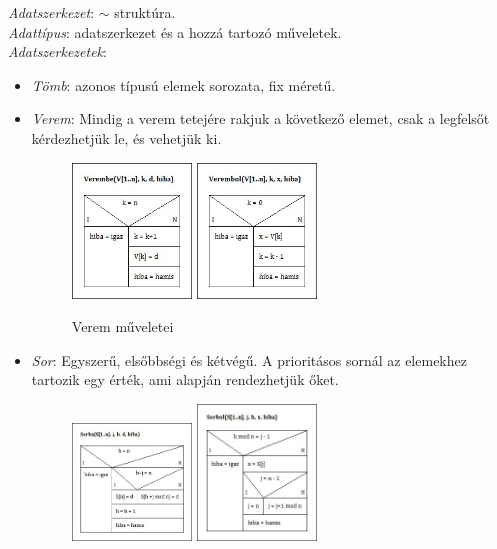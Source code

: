 \documentclass[margin=0px]{article}
\begin{document}
	\textit{Adatszerkezet}: $\sim$ struktúra. \\
	\textit{Adattípus}: adatszerkezet és a hozzá tartozó műveletek. \\
	\textit{Adatszerkezetek}:
	\begin{itemize}
		\item \textit{Tömb}: azonos típusú elemek sorozata, fix méretű.
		\item \textit{Verem}: Mindig a verem tetejére rakjuk a következő elemet, csak a legfelsőt kérdezhetjük le, és vehetjük ki.
		\begin{figure}[H]
			\centering
			\includegraphics[width=0.3\textwidth]{img/Verembe.jpg}
			\includegraphics[width=0.3\textwidth]{img/Verembol.jpg}
			\caption{Verem műveletei}
		\end{figure}
		\item \textit{Sor}: Egyszerű, elsőbbségi és kétvégű. A prioritásos sornál az elemekhez tartozik egy érték, ami alapján rendezhetjük  őket.
		\begin{figure}[H]
			\centering
			\includegraphics[width=0.3\textwidth]{img/Sorba.jpg}
			\includegraphics[width=0.3\textwidth]{img/Sorbol.jpg}

\end{figure}
\end{itemize}
\end{document}
